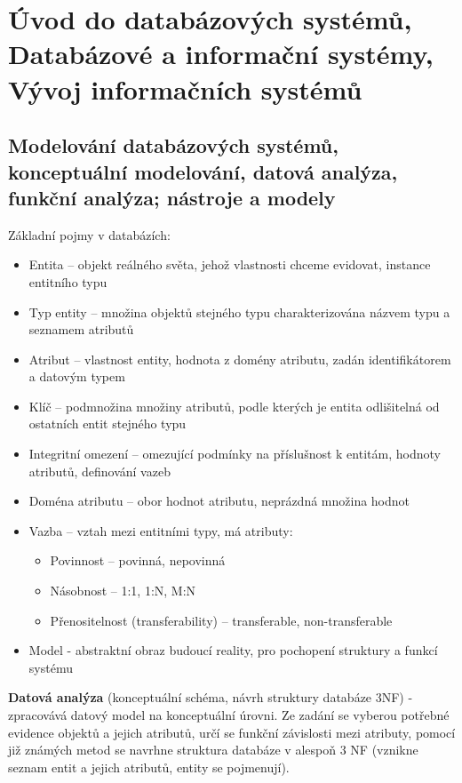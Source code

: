 \section{Úvod do databázových systémů, Databázové a informační systémy, Vývoj informačních systémů}
\subsection[Modelování DBS, konceptuální, analýza]{Modelování databázových systémů, konceptuální modelování, datová analýza, funkční analýza; nástroje a modely}
Základní pojmy v databázích:
\begin{itemize}
\item Entita – objekt reálného světa, jehož vlastnosti chceme evidovat, instance entitního typu
\item Typ entity – množina objektů stejného typu charakterizována názvem typu a seznamem atributů
\item Atribut – vlastnost entity, hodnota z domény atributu, zadán identifikátorem a datovým typem
\item Klíč – podmnožina množiny atributů, podle kterých je entita odlišitelná od ostatních entit stejného typu
\item Integritní omezení – omezující podmínky na příslušnost k entitám, hodnoty atributů, definování vazeb
\item Doména atributu – obor hodnot atributu, neprázdná množina hodnot
\item Vazba – vztah mezi entitními typy, má atributy:
	\begin{itemize}
	\item Povinnost – povinná, nepovinná
	\item Násobnost – 1:1, 1:N, M:N
	\item Přenositelnost (transferability) – transferable, non-transferable
	\end{itemize}
\item Model - abstraktní obraz budoucí reality, pro pochopení struktury a funkcí systému
\end{itemize}

\textbf{Datová analýza} (konceptuální schéma, návrh struktury databáze 3NF) - zpracovává datový model na konceptuální úrovni. Ze zadání se vyberou potřebné evidence objektů a jejich atributů, určí se funkční závislosti mezi atributy, pomocí již známých metod se navrhne struktura databáze v alespoň 3 NF (vznikne seznam entit a jejich atributů, entity se pojmenují).


